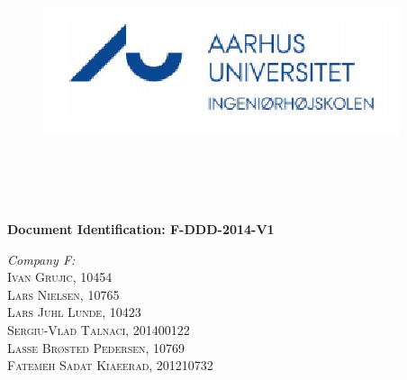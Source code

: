 \begin{titlepage}
\begin{center}



\begin{figure}
\includegraphics[scale=0.5]{./images/logo.png}\\
\\   
\\
\end{figure}
\\[0.5cm]
\\[2cm]

{ \bfseries Document Identification: F-DDD-2014-V1}\\[2cm]



\begin{flushleft} \large
\emph{Company F:}\\
\textsc{Ivan Grujic, 10454\\}
\textsc{Lars Nielsen, 10765\\}
\textsc{Lars Juhl Lunde, 10423\\}
\textsc{Sergiu-Vlad Talnaci, 201400122\\}
\textsc{Lasse Br\o sted Pedersen, 10769\\}
\textsc{Fatemeh Sadat Kiaeerad, 201210732}\\[2cm]
 \\ 
\\
\end{flushleft}





\end{center}
\end{titlepage}
